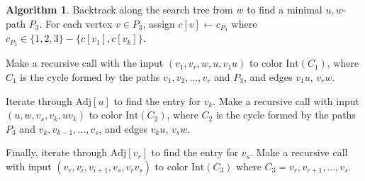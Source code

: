 \documentclass[12pt,letterpaper]{article}
\theoremstyle{plain}
\theoremstyle{definition}
\theoremstyle{break}
\newtheorem{algorithm}[lemma]{Algorithm}     %
\begin{document}
\begin{algorithm}
Backtrack along the search tree from $w$ to find a minimal $u,w$-path $P_3$.
For each vertex $v\in P_3$, assign $c[v]\leftarrow c_{P_3}$ where $c_{P_3}\in
\{1,2,3\}-\{c[v_1],c[v_k]\}$.

Make a recursive call with the input $(v_1, v_r, w, u, v_1u)$ to color
$\text{Int}(C_1)$, where $C_1$ is the cycle formed by the paths
$v_1,v_2,\ldots,v_r$ and $P_3$, and edges
$v_1u$, $v_rw$.

Iterate through
$\text{Adj}[u]$ to find the entry for $v_k$.
Make a recursive
call with input $(u, w, v_s, v_k, uv_k)$ to color $\text{Int}(C_2)$, where
$C_2$ is the cycle formed by the paths
$P_3$ and $v_k,v_{k-1},\ldots,v_s$, and edges
$v_ku$, $v_sw$.

Finally, iterate through $\text{Adj}[v_r]$ to find the
entry for $v_s$. Make a recursive call with input
$(v_r, v_i, v_{i+1}, v_s, v_rv_s)$
to color $\text{Int}(C_3)$ where $C_3=v_r,v_{r+1},\ldots,v_s$.
\end{algorithm}
\end{document}
